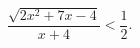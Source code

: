 \begin{ex}[type=inequality]
	\begin{condition}
		$ \dfrac{\sqrt{2x^2 + 7x - 4}}{x + 4}<\dfrac{1}{2}.$
	\end{condition}
\end{ex}